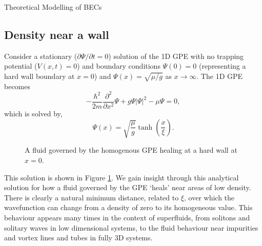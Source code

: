 \begin{chapter}{\label{cha:theoretical_model}Theoretical Modelling of BECs}
	\subsection{\label{section:wall} Density near a wall}
	Consider a stationary ($\partial \Psi / \partial t = 0$) solution of the 1D GPE with no trapping potential ($V(x,t)=0$) and boundary conditions $\Psi(0)=0$ (representing a hard wall boundary at $x=0$) and $\Psi(x)=\sqrt{\mu/g}$ as $x\rightarrow\infty$. The 1D GPE becomes
	\begin{equation}
		-\frac{\hbar^2 }{2m}\frac{\partial^2}{\partial x^2}\Psi + g\Psi|\Psi|^2 - \mu\Psi = 0,
	\end{equation}
	which is solved by,
	\begin{equation}
		\Psi(x) = \sqrt{\frac{\mu}{g}}\tanh \left( \frac{x}{\xi} \right).
	\end{equation}
	\begin{figure}[!ht]
	\centering
  \caption{A fluid governed by the homogenous GPE healing at a hard wall at $x=0$.}\label{fig_wallsoln}
 \end{figure}
	This solution is shown in Figure \ref{fig_wallsoln}. We gain insight through this analytical solution for how a fluid governed by the GPE `heals' near areas of low density. There is clearly a natural minimum distance, related to $\xi$, over which the wavefunction can change from a density of zero to its homogeneous value. This behaviour appears many times in the context of superfluids, from solitons and solitary waves in low dimensional systems, to the fluid behaviour near impurities and vortex lines and tubes in fully 3D systems. 


\end{chapter}
